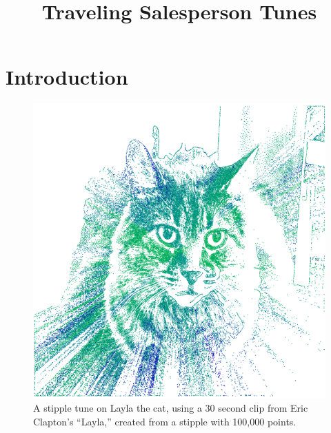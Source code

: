 \documentclass{article}
\title{Traveling Salesperson Tunes}
\begin{document}
%
\maketitle
%
\begin{abstract}
  

\end{abstract}
%
\section{Introduction}\label{sec:introduction}

\begin{figure}
  \centering
  \includegraphics[width=0.8\columnwidth]{laylaViterbiStipple.png}
  \caption{A stipple tune on Layla the cat, using a 30 second clip from Eric Clapton's ``Layla,'' created from a stipple with 100,000 points.}
  \label{fig:laylaViterbiStipple}
\end{figure}
\end{document}
